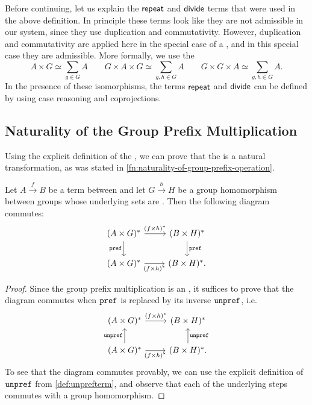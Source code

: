 Before continuing, let us explain the $\mathsf{repeat}$ and $\mathsf{divide}$ terms that were used in the above definition. In principle these terms look like they are not admissible in our system, since they use duplication and commutativity. However, duplication and commutativity are applied here in the special case of a , and in this special case they are admissible. More formally, we use the  
\begin{equation}
    \label{eq:finite-group-isomorphisms}
A \times G \simeq 
\sum_{g \in G} A 
\qquad 
G \times A \times G 
\simeq 
\sum_{g,h \in G} A 
\qquad 
G \times G \times A
\simeq 
\sum_{g,h \in G} A.
\end{equation}
In the presence of these isomorphisms, the terms $\mathsf{repeat}$ and $\mathsf{divide}$ can be defined by using case reasoning and coprojections.


\subsection{Naturality of the Group Prefix Multiplication}
\label{sec:naturality-of-group-prefix-operation}
Using the explicit definition of the , we can prove that the  is a natural transformation, as was stated in \cref{fn:naturality-of-group-prefix-operation}.


\begin{lemma}\label{lem:naturality-of-group-prefix-operation}
    Let $A \xrightarrow f B$ be a term between  and let $G \xrightarrow h H$ be a group homomorphism between groups whose underlying sets are . Then the following diagram commutes: 
\[
\begin{tikzcd}
    (A \times G)^* \arrow[r, "{(f \times h)^*}"] \arrow[d, "\prefterm"'] & (B \times H)^* \arrow[d, "\prefterm"] \\
    (A \times G)^* \arrow[r, "{(f \times h)^*}"'] & (B \times H)^*.
\end{tikzcd}
\]    
\end{lemma}
\begin{proof}
    Since the group prefix multiplication is an , it suffices to prove that the diagram commutes when $\mathtt{pref}$ is replaced by its inverse $\mathtt{unpref}$, i.e.
    \[
\begin{tikzcd}
    (A \times G)^* \arrow[r, "{(f \times h)^*}"]  & (B \times H)^*  \\
    (A \times G)^* \arrow[r, "{(f \times h)^*}"']
    \arrow[u, "\unprefterm"] & 
    (B \times H)^* 
    \arrow[u, "\unprefterm"'].
\end{tikzcd}
\]    
To see that the diagram commutes provably, we can use the explicit definition of $\mathtt{unpref}$ from \cref{def:unprefterm}, and observe that each of the underlying steps commutes with a group homomorphism. 
\end{proof}


